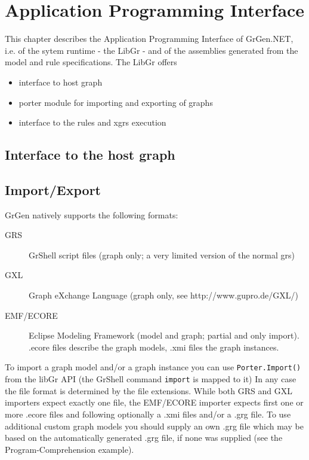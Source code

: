 \chapter{Application Programming Interface}
\label{chapapi}

This chapter describes the Application Programming Interface of GrGen.NET, i.e. of the sytem runtime - the LibGr - and of the assemblies generated from the model and rule specifications.
The LibGr offers
\begin{itemize}
\item interface to host graph
\item porter module for importing and exporting of graphs
\item interface to the rules and xgrs execution
\end{itemize}

\section{Interface to the host graph}

\section{Import/Export}

GrGen natively supports the following formats:
\begin{description}
  \item[GRS] GrShell script files (graph only; a very limited version of the normal grs)
  \item[GXL] Graph eXchange Language (graph only, see http://www.gupro.de/GXL/)
  \item[EMF/ECORE] Eclipse Modeling Framework (model and graph; partial and only import).
      .ecore files describe the graph models, .xmi files the graph instances.
\end{description}

To import a graph model and/or a graph instance you can use
\verb#Porter.Import()# from the libGr API (the GrShell command \verb#import# is mapped to it)
In any case the file format is determined by the file extensions.
While both GRS and GXL importers expect exactly one file, the EMF/ECORE importer
expects first one or more .ecore files and following optionally a .xmi files and/or
a .grg file. To use additional custom graph models you should supply an own .grg
file which may be based on the automatically generated .grg file, if none was
supplied (see the Program-Comprehension example).


